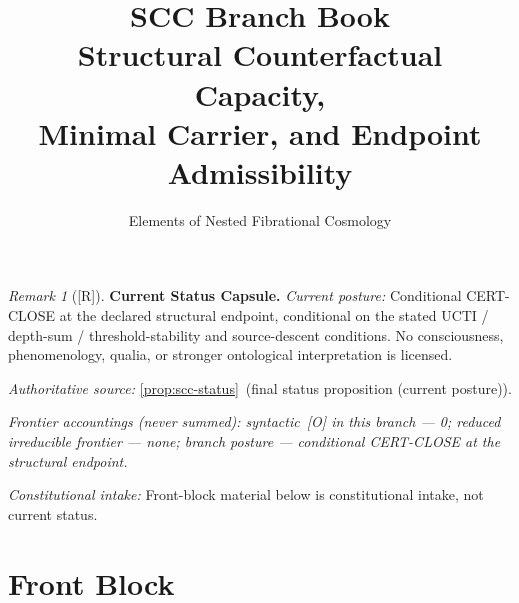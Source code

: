 \documentclass[12pt,oneside]{amsbook}
\theoremstyle{plain}
\theoremstyle{definition}
\theoremstyle{remark}
\newtheorem{remark}[theorem]{Remark}
\newcommand{\status}[1]{\textup{[#1]}}
\begin{document}
\title{SCC Branch Book\\[6pt]
 Structural Counterfactual Capacity,\\
 Minimal Carrier, and Endpoint Admissibility}
\author{Elements of Nested Fibrational Cosmology}
\date{}
\maketitle

\tableofcontents

\bigskip


\begin{remark}[\status{R}]\label{cap:SCC-status}
\textbf{Current Status Capsule.}
\emph{Current posture:} Conditional CERT-CLOSE at the declared structural endpoint, conditional on the stated UCTI / depth-sum / threshold-stability and source-descent conditions. No consciousness, phenomenology, qualia, or stronger ontological interpretation is licensed.

\emph{Authoritative source:} \ref{prop:scc-status}~(final status proposition (current posture)).

\emph{Frontier accountings (never summed): syntactic~[O] in this branch --- 0; reduced irreducible frontier --- none; branch posture --- conditional CERT-CLOSE at the structural endpoint.}

\emph{Constitutional intake:} Front-block material below is constitutional intake, not current status.
\end{remark}

\section*{Front Block}
\end{document}
